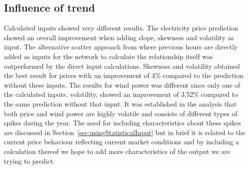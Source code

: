 \subsection{Influence of trend}
\label{sec:influenceOfTrendInCalcInput}
Calculated inputs showed very different results. The electricity price prediction showed an overall improvement when adding slope, skewness and volatility as input. The alternative scatter approach from \cite{singhal2011electricity} where previous hours are directly added as inputs for the network to calculate the relationship itself was outperformed by the direct input calculations. Skewness and volatility obtained the best result for prices with an improvement of 4\% compared to the prediction without these inputs. The results for wind power was different since only one of the calculated inputs, volatility, showed an improvement of 3,52\% compared to the same prediction without that input. It was established in the analysis that both price and wind power are highly volatile and consists of different types of spikes during the year. The need for including characteristics about these spikes are discussed in Section~\ref{sec:usingStatisticalInput} but in brief it is related to the current price behaviour reflecting current market conditions and by including a calculation thereof we hope to add more characteristics of the output we are trying to predict. 

